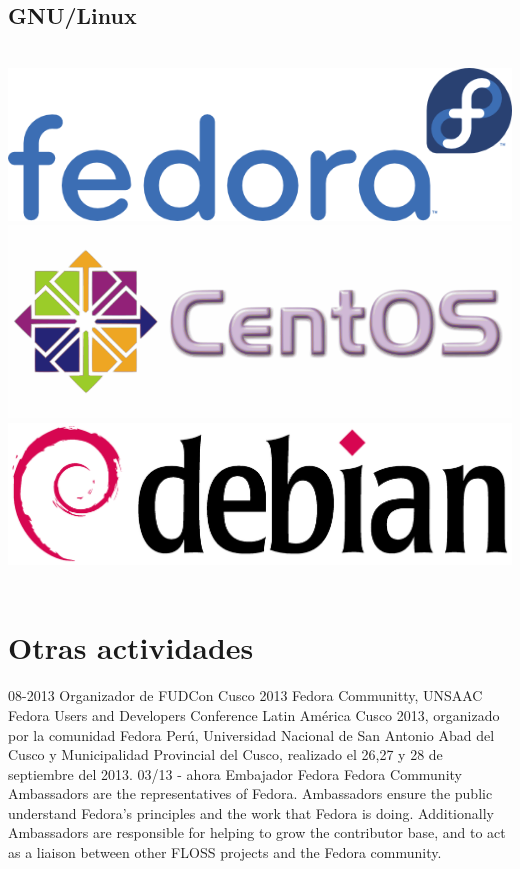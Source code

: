 \documentclass[]{friggeri-cv}
\begin{document}
\begin{aside}
    \section{GNU/Linux}
    ~
    \includegraphics[scale=0.12]{img/fedora}
    \includegraphics[scale=0.12]{img/centos}
    \includegraphics[scale=0.10]{img/debian}
    ~
\end{aside}

\newpage
\section{Otras actividades}
\begin{entrylist}
    \entry
    {08-2013}
    {Organizador de FUDCon Cusco 2013}
    {Fedora Communitty, UNSAAC}
    {Fedora Users and Developers Conference Latin América Cusco 2013, organizado
    por la comunidad Fedora Perú, Universidad Nacional de San Antonio Abad del
    Cusco y Municipalidad Provincial del Cusco, realizado el 26,27 y 28 de
    septiembre del 2013.}
    \entry
    {03/13 - ahora}
    {Embajador Fedora}
    {Fedora Community}
    {Ambassadors are the representatives of Fedora. Ambassadors ensure the public
    understand Fedora's principles and the work that Fedora is doing. Additionally
    Ambassadors are responsible for helping to grow the contributor base, and to
    act as a liaison between other FLOSS projects and the Fedora community. }
\end{entrylist}
%
\end{document}
